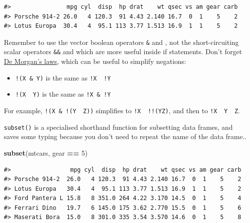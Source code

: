 \documentclass[]{book}
\newenvironment{Shaded}{\begin{snugshade}}{\end{snugshade}}
\newcommand{\KeywordTok}[1]{\textcolor[rgb]{0.13,0.29,0.53}{\textbf{#1}}}
\newcommand{\DecValTok}[1]{\textcolor[rgb]{0.00,0.00,0.81}{#1}}
\newcommand{\StringTok}[1]{\textcolor[rgb]{0.31,0.60,0.02}{#1}}
\newcommand{\OperatorTok}[1]{\textcolor[rgb]{0.81,0.36,0.00}{\textbf{#1}}}
\newcommand{\NormalTok}[1]{#1}
\providecommand{\tightlist}{%
  \setlength{\itemsep}{0pt}\setlength{\parskip}{0pt}}
\theoremstyle{definition}
\theoremstyle{definition}
\theoremstyle{definition}
\theoremstyle{remark}
\begin{document}
\begin{Shaded}
\end{Shaded}

\begin{verbatim}
#>                mpg cyl  disp  hp drat    wt qsec vs am gear carb
#> Porsche 914-2 26.0   4 120.3  91 4.43 2.140 16.7  0  1    5    2
#> Lotus Europa  30.4   4  95.1 113 3.77 1.513 16.9  1  1    5    2
\end{verbatim}

Remember to use the vector boolean operators \texttt{\&} and
\texttt{\textbar{}}, not the short-circuiting scalar operators
\texttt{\&\&} and \texttt{\textbar{}\textbar{}} which are more useful
inside if statements. Don't forget
\href{https://en.wikipedia.org/wiki/De_Morgan\%27s_laws}{De Morgan's
laws}, which can be useful to simplify negations:

\begin{itemize}
\tightlist
\item
  \texttt{!(X\ \&\ Y)} is the same as \texttt{!X\ \textbar{}\ !Y}
\item
  \texttt{!(X\ \textbar{}\ Y)} is the same as \texttt{!X\ \&\ !Y}
\end{itemize}

For example, \texttt{!(X\ \&\ !(Y\ \textbar{}\ Z))} simplifies to
\texttt{!X\ \textbar{}\ !!(Y\textbar{}Z)}, and then to
\texttt{!X\ \textbar{}\ Y\ \textbar{}\ Z}.

\texttt{subset()} is a specialised shorthand function for subsetting
data frames, and saves some typing because you don't need to repeat the
name of the data frame..

\begin{Shaded}
\begin{Highlighting}[]
\KeywordTok{subset}\NormalTok{(mtcars, gear }\OperatorTok{==}\StringTok{ }\DecValTok{5}\NormalTok{)}
\end{Highlighting}
\end{Shaded}

\begin{verbatim}
#>                 mpg cyl  disp  hp drat    wt qsec vs am gear carb
#> Porsche 914-2  26.0   4 120.3  91 4.43 2.140 16.7  0  1    5    2
#> Lotus Europa   30.4   4  95.1 113 3.77 1.513 16.9  1  1    5    2
#> Ford Pantera L 15.8   8 351.0 264 4.22 3.170 14.5  0  1    5    4
#> Ferrari Dino   19.7   6 145.0 175 3.62 2.770 15.5  0  1    5    6
#> Maserati Bora  15.0   8 301.0 335 3.54 3.570 14.6  0  1    5    8
\end{verbatim}
\end{document}
